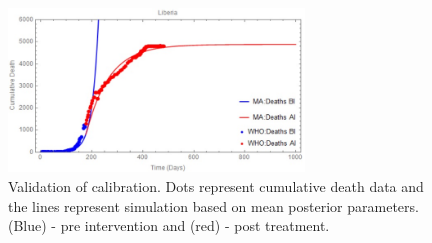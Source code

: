 \begin{figure}[h]
  \centering
  \includegraphics[width=0.7\textwidth]{CumulativeDeathMathematica}
  \caption{Validation of calibration. Dots represent cumulative death data and the lines represent simulation based on mean posterior parameters. (Blue) - pre intervention and (red) - post treatment.}
\label{fig:Cumulative Death Plot}
\end{figure}
